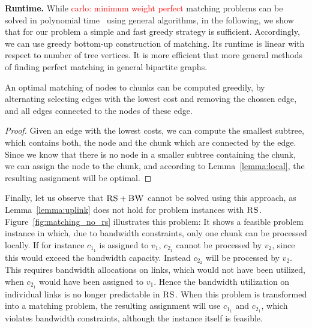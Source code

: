 \documentclass[9pt]{sigcomm-alternate}
\newcommand{\carlo}[1]{\textcolor{red}{carlo: #1}}
\newcommand{\VirtualNode}{v}
\newcommand{\achunk}{\ensuremath{c}}
\newcommand{\RS}{\textsc{RS}}
\newcommand{\BW}{\textsc{BW}}
\begin{document}
\textbf{Runtime.} While \carlo{minimum weight perfect} matching problems can be 
solved in polynomial 
time~\cite{schrijver_combinatorial_optimization} using
general algorithms, in the following, we show that for our problem
a simple and fast greedy strategy is sufficient.
Accordingly, we can use greedy bottom-up construction of matching.
Its runtime is linear with respect to number of tree vertices. It is more 
efficient that more general methods of
finding perfect matching in general bipartite graphs.

\begin{corollary}
An optimal matching of nodes to chunks can be computed greedily, by 
alternating selecting edges with the lowest cost and removing the chossen 
edge, and all edges connected to the nodes of these edge.
\end{corollary}

\begin{proof}
Given an edge with the lowest costs, we can compute the smallest subtree, which 
contains both, the node and the chunk which are connected by the edge. Since we 
know that there is no node in a smaller subtree containing the chunk, we can 
assign the node to the chunk, and according to Lemma~\ref{lemma:local}, the 
resulting assignment will be optimal.
\end{proof}



Finally, let us observe that $\RS+\BW$ cannot be solved using this approach, 
as Lemma~\ref{lemma:uplink} does not
hold for problem instances with $\RS$. Figure~\ref{fig:matching_no_rs}
illustrates this problem: It shows a feasible problem instance in which, due
to bandwidth constraints, only one chunk can be processed locally. If for
instance $\achunk_{1_1}$ is assigned to $\VirtualNode_1$, $\achunk_{2_1}$ cannot
be processed by $\VirtualNode_2$, since this would exceed the bandwidth
capacity. Instead $\achunk_{2_2}$ will be processed by $\VirtualNode_2$. This
requires bandwidth allocations on links, which would not have been utilized,
when $\achunk_{2_1}$ would have been assigned to $\VirtualNode_1$. Hence the
bandwidth utilization on individual links is no longer predictable in $\RS$.
When this problem is transformed into a matching problem, the resulting
assignment will use $\achunk_{1_1}$ and $\achunk_{2_1}$, which violates
bandwidth constraints, although the instance itself is feasible.
\end{document}
